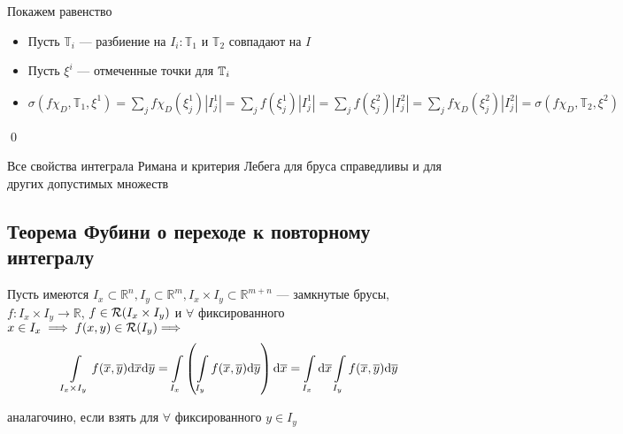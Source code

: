 \documentclass[a4paper]{article}
\begin{document}
Покажем равенство
\begin{itemize}
    \item Пусть $\mathbb{T}_i$ — разбиение на $I_i:\mathbb{T}_1$ и $\mathbb{T}_2$ совпадают на $I$
    \item Пусть $\xi^i$ — отмеченные точки для $\operatorname{\mathbb{T}}_i$
    \item $\sigma(f\chi_D,\mathbb{T}_1,\xi^1)=\sum_{j}f\chi_D(\xi^1_j)|I_j^1|=\sum_j f(\xi^1_j)|I^1_j|=\sum_j f(\xi^2_j)|I^2_j|=\sum_j f\chi_D(\xi_j^2)|I_j^2|=\sigma(f\chi_D, \mathbb{T}_2, \xi^2)$
\end{itemize}\qed

\comment Все свойства интеграла Римана и критерия Лебега для бруса справедливы и для других допустимых множеств
 
\subsection{Теорема Фубини о переходе к повторному интегралу}
Пусть имеются $I_x\subset\mathbb{R}^n, I_y\subset\mathbb{R}^m, I_x\times I_y\subset \mathbb{R}^{m+n}$ — замкнутые брусы, $f:I_x\times I_y\rightarrow \mathbb{R}$, $f\in\mathcal{R}(I_x\times I_y)$ и $\forall$ фиксированного $x\in I_x \implies f(x,y)\in\mathcal{R}(I_y)\Longrightarrow$
\begin{equation*}
    \int\limits_{I_x\times I_y} f(\overline{x}, \overline{y})\text{d}\overline{x}\text{d}\overline{y}=\int\limits_{I_x}\left(\int\limits_{I_y}f(\overline{x},\overline{y})\text{d}\overline{y}\right)\text{d}\overline{x}=\int\limits_{I_x}\text{d}\overline{x}\int\limits_{I_y}f(\overline{x}, \overline{y})\text{d}\overline{y}
\end{equation*}

\comment аналагочино, если взять для $\forall$ фиксированного $y\in I_y$
\end{document}
